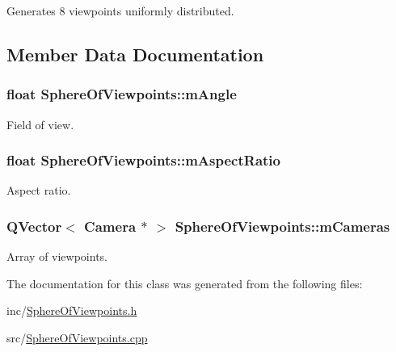 Generates 8 viewpoints uniformly distributed. 



\subsection{Member Data Documentation}
\hypertarget{class_sphere_of_viewpoints_a555d6ce55b40deec00939ee8704274a5}{
\subsubsection[{m\+Angle}]{\setlength{\rightskip}{0pt plus 5cm}float Sphere\+Of\+Viewpoints\+::m\+Angle\hspace{0.3cm}{\ttfamily [protected]}}}\label{class_sphere_of_viewpoints_a555d6ce55b40deec00939ee8704274a5}


Field of view. 

\hypertarget{class_sphere_of_viewpoints_a8adb7d9727efdc995bd5088df9ea6237}{
\subsubsection[{m\+Aspect\+Ratio}]{\setlength{\rightskip}{0pt plus 5cm}float Sphere\+Of\+Viewpoints\+::m\+Aspect\+Ratio\hspace{0.3cm}{\ttfamily [protected]}}}\label{class_sphere_of_viewpoints_a8adb7d9727efdc995bd5088df9ea6237}


Aspect ratio. 

\hypertarget{class_sphere_of_viewpoints_a7b0e47466c3a44bf5b1f47974cdbe032}{
\subsubsection[{m\+Cameras}]{\setlength{\rightskip}{0pt plus 5cm}Q\+Vector$<$ {\bf Camera} $\ast$ $>$ Sphere\+Of\+Viewpoints\+::m\+Cameras\hspace{0.3cm}{\ttfamily [protected]}}}\label{class_sphere_of_viewpoints_a7b0e47466c3a44bf5b1f47974cdbe032}


Array of viewpoints. 



The documentation for this class was generated from the following files\+:\begin{DoxyCompactItemize}
\item 
inc/\hyperlink{_sphere_of_viewpoints_8h}{Sphere\+Of\+Viewpoints.\+h}\item 
src/\hyperlink{_sphere_of_viewpoints_8cpp}{Sphere\+Of\+Viewpoints.\+cpp}\end{DoxyCompactItemize}
